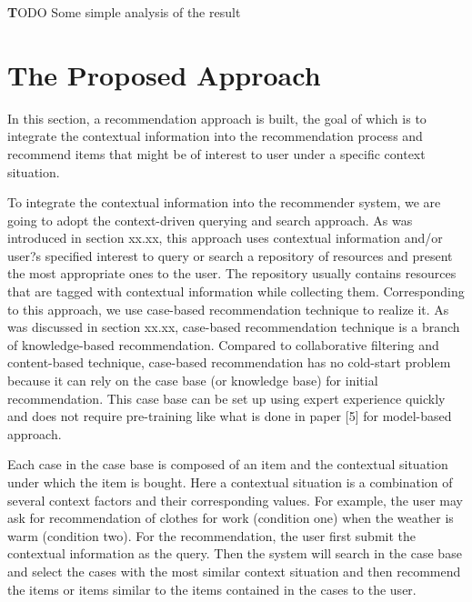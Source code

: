 \textbf TODO Some simple analysis of the result

\section{The Proposed Approach} \label{sec:pa}

In this section, a recommendation approach is built, the goal of which is to integrate the contextual information into the recommendation process and recommend items that might be of interest to user under a specific context situation.

To integrate the contextual information into the recommender system, we are going to adopt the context-driven querying and search approach. As was introduced in section xx.xx, this approach uses contextual information and/or user?s specified interest to query or search a repository of resources and present the most appropriate ones to the user. The repository usually contains resources that are tagged with contextual information while collecting them. Corresponding to this approach, we use case-based recommendation technique to realize it. As was discussed in section xx.xx, case-based recommendation technique is a branch of knowledge-based recommendation. Compared to collaborative filtering and content-based technique, case-based recommendation has no cold-start problem because it can rely on the case base (or knowledge base) for initial recommendation. This case base can be set up using expert experience quickly and does not require pre-training like what is done in paper [5] for model-based approach. 

Each case in the case base is composed of an item and the contextual situation under which the item is bought. Here a contextual situation is a combination of several context factors and their corresponding values. For example, the user may ask for recommendation of clothes for work (condition one) when the weather is warm (condition two). For the recommendation, the user first submit the contextual information as the query. Then the system will search in the case base and select the cases with the most similar context situation and then recommend the items or items similar to the items contained in the cases to the user. 

